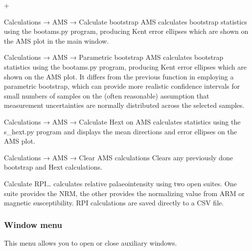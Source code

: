 \documentclass[a4paper,british]{article}
\newcommand{\menuitemlabel}[1]{%
\mbox{\textsf{#1}}\hfil}
\newenvironment{menuitemlist}%
{\begin{list}{}{%
\renewcommand{\makelabel}{\menuitemlabel}%
\setlength{\labelwidth}{35pt}%
\setlength{\leftmargin}%
             {\labelwidth+\labelsep}}}%
{\end{list}}
\newcommand{\ppcmd}[1]{\textsf{#1}} %
\newcommand{\caps}[1]{\MakeTextUppercase{#1}} %
\newcommand{\submenu}{ \textrm{→} }
\begin{document}
\begin{menuitemlist}
\item[Calculations\submenu \caps{ams}\submenu Calculate bootstrap
  \caps{ams}] calculates bootstrap statistics using the
  \ppcmd{bootams.py} program, producing Kent error ellipses which are
  shown on the \caps{ams} plot in the main window.

\item[Calculations\submenu \caps{ams}\submenu Parametric bootstrap
  \caps{ams}] calculates bootstrap statistics using the
  \ppcmd{bootams.py} program, producing Kent error ellipses which are
  shown on the \caps{ams} plot. It differs from the previous function in
  employing a parametric bootstrap, which can provide more realistic
  confidence intervals for small numbers of samples on the (often
  reasonable) assumption that measurement uncertainties are normally
  distributed across the selected samples.

\item[Calculations\submenu \caps{ams}\submenu Calculate Hext on
  \caps{ams}] calculates \cite{hext1963tensors} statistics using the
  \ppcmd{s\_hext.py} program and displays the mean directions and error
  ellipses on the \caps{ams} plot.

\item[Calculations\submenu \caps{ams}\submenu Clear \caps{ams}
  calculations] Clears any previously done bootstrap and Hext
  calculations.

\item[Calculate RPI\ldots] calculates relative palaeointensity using two
  open suites. One suite provides the \caps{nrm}, the other provides the
  normalizing value from \caps{arm} or magnetic susceptibility.
  \caps{Rpi} calculations are saved directly to a \caps{csv} file.

\end{menuitemlist}

\subsubsection{\label{sec:menu-window}Window menu}

This menu allows you to open or close auxiliary windows.
\end{document}
